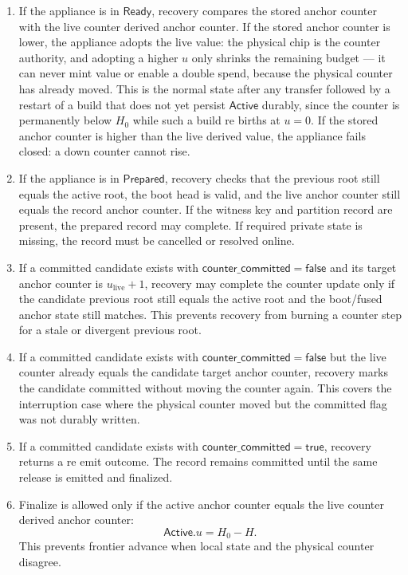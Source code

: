 \documentclass[11pt]{article}
\theoremstyle{definition}
\theoremstyle{remark}
\newcommand{\Active}{\ensuremath{\mathsf{Active}}}
\newcommand{\Ready}{\ensuremath{\mathsf{Ready}}}
\newcommand{\Prepared}{\ensuremath{\mathsf{Prepared}}}
\begin{document}
\begin{enumerate}[label=(\arabic*),leftmargin=2em]
\item If the appliance is in \(\Ready\), recovery compares the stored anchor counter with the live
counter derived anchor counter. If the stored anchor counter is lower, the appliance adopts the
live value: the physical chip is the counter authority, and adopting a higher \(u\) only shrinks
the remaining budget --- it can never mint value or enable a double spend, because the physical
counter has already moved. This is the normal state after any transfer followed by a restart of a
build that does not yet persist \(\Active\) durably, since the counter is permanently below
\(H_0\) while such a build re births at \(u=0\). If the stored anchor counter is higher than the
live derived value, the appliance fails closed: a down counter cannot rise.

\item If the appliance is in \(\Prepared\), recovery checks that the previous root still equals the
active root, the boot head is valid, and the live anchor counter still equals the record anchor
counter. If the witness key and partition record are present, the prepared record may complete. If
required private state is missing, the record must be cancelled or resolved online.

\item If a committed candidate exists with \(\mathsf{counter\_committed}=\mathsf{false}\) and its
target anchor counter is \(u_{\mathrm{live}}+1\), recovery may complete the counter update only if
the candidate previous root still equals the active root and the boot/fused anchor state still
matches. This prevents recovery from burning a counter step for a stale or divergent previous root.

\item If a committed candidate exists with \(\mathsf{counter\_committed}=\mathsf{false}\) but the
live counter already equals the candidate target anchor counter, recovery marks the candidate
committed without moving the counter again. This covers the interruption case where the physical
counter moved but the committed flag was not durably written.

\item If a committed candidate exists with \(\mathsf{counter\_committed}=\mathsf{true}\), recovery
returns a re emit outcome. The record remains committed until the same release is emitted and
finalized.

\item Finalize is allowed only if the active anchor counter equals the live counter derived anchor
counter:
\[
\Active.u = H_0-H.
\]
This prevents frontier advance when local state and the physical counter disagree.
\end{enumerate}
\end{document}
